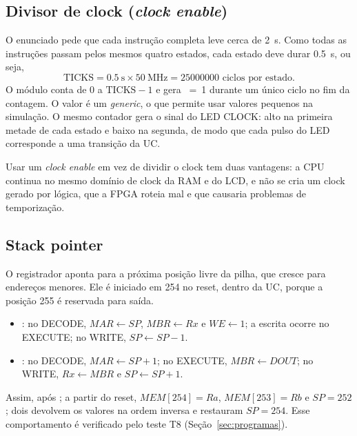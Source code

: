\subsection{Divisor de clock (\emph{clock enable})}
\label{sec:ce}

O enunciado pede que cada instrução completa leve cerca de \SI{2}{\second}. Como
todas as instruções passam pelos mesmos quatro estados, cada estado deve durar
\SI{0,5}{\second}, ou seja,
\[
  \text{TICKS} = \SI{0,5}{\second} \times \SI{50}{\mega\hertz} = \num{25000000}
  \text{ ciclos por estado.}
\]
O módulo  conta de 0 a $\text{TICKS}-1$ e gera
~=~1 durante um único ciclo no fim da contagem. O valor é um
\emph{generic}, o que permite usar valores pequenos na simulação. O mesmo
contador gera o sinal do LED CLOCK: alto na primeira metade de cada estado e
baixo na segunda, de modo que cada pulso do LED corresponde a uma transição da
UC.

Usar um \emph{clock enable} em vez de dividir o clock tem duas vantagens: a
CPU continua no mesmo domínio de clock da RAM e do LCD, e não se cria um clock
gerado por lógica, que a FPGA roteia mal e que causaria problemas de
temporização.

\subsection{Stack pointer}

O registrador  aponta para a próxima posição livre da pilha, que cresce
para endereços menores. Ele é iniciado em 254 no reset, dentro da UC, porque a
posição 255 é reservada para saída.

\begin{itemize}[nosep]
  \item {}: no DECODE, $MAR \gets SP$, $MBR \gets Rx$ e
        $WE \gets 1$; a escrita ocorre no EXECUTE; no WRITE, $SP \gets SP - 1$.
  \item {}: no DECODE, $MAR \gets SP + 1$; no EXECUTE,
        $MBR \gets DOUT$; no WRITE, $Rx \gets MBR$ e $SP \gets SP + 1$.
\end{itemize}

Assim, após ;  a partir do reset, $MEM[254] = Ra$,
$MEM[253] = Rb$ e $SP = 252$; dois  devolvem os valores na ordem
inversa e restauram $SP = 254$. Esse comportamento é verificado pelo teste T8
(Seção~\ref{sec:programas}).
